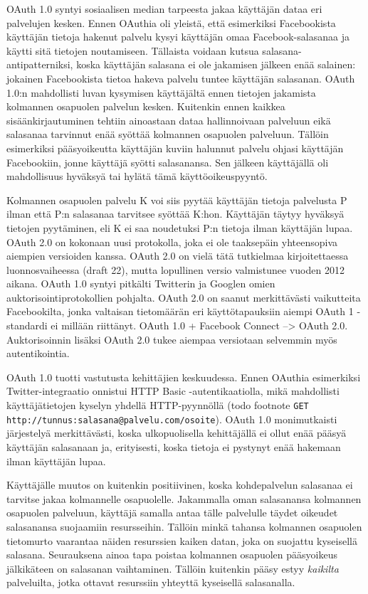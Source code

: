 \documentclass[finnish,gradu]{tktltiki}
\begin{document}
  OAuth 1.0 syntyi sosiaalisen median tarpeesta jakaa käyttäjän dataa eri palvelujen kesken. Ennen OAuthia oli yleistä, että esimerkiksi Facebookista käyttäjän tietoja hakenut palvelu kysyi käyttäjän omaa Facebook-salasanaa ja käytti sitä tietojen noutamiseen. Tällaista voidaan kutsua salasana-antipatterniksi, koska käyttäjän salasana ei ole jakamisen jälkeen enää salainen: jokainen Facebookista tietoa hakeva palvelu tuntee käyttäjän salasanan. OAuth 1.0:n mahdollisti luvan kysymisen käyttäjältä ennen tietojen jakamista kolmannen osapuolen palvelun kesken. Kuitenkin ennen kaikkea sisäänkirjautuminen tehtiin ainoastaan dataa hallinnoivaan palveluun eikä salasanaa tarvinnut enää syöttää kolmannen osapuolen palveluun. Tällöin esimerkiksi pääsyoikeutta käyttäjän kuviin halunnut palvelu ohjasi käyttäjän Facebookiin, jonne käyttäjä syötti salasanansa. Sen jälkeen käyttäjällä oli mahdollisuus hyväksyä tai hylätä tämä käyttöoikeuspyyntö.

  Kolmannen osapuolen palvelu K voi siis pyytää käyttäjän tietoja palvelusta P ilman että P:n salasanaa tarvitsee syöttää K:hon. Käyttäjän täytyy hyväksyä tietojen pyytäminen, eli K ei saa noudetuksi P:n tietoja ilman käyttäjän lupaa.
  OAuth 2.0 on kokonaan uusi protokolla, joka ei ole taaksepäin yhteensopiva aiempien versioiden kanssa. OAuth 2.0 on vielä tätä tutkielmaa kirjoitettaessa luonnosvaiheessa (draft 22), mutta lopullinen versio valmistunee vuoden 2012 aikana. OAuth 1.0 syntyi pitkälti Twitterin ja Googlen omien auktorisointiprotokollien pohjalta. OAuth 2.0 on saanut merkittävästi vaikutteita Facebookilta, jonka valtaisan tietomäärän eri käyttötapauksiin aiempi OAuth 1 -standardi ei millään riittänyt. OAuth 1.0 + Facebook Connect --> OAuth 2.0. Auktorisoinnin lisäksi OAuth 2.0 tukee aiempaa versiotaan selvemmin myös autentikointia.

  OAuth 1.0 tuotti vastutusta kehittäjien keskuudessa. Ennen OAuthia esimerkiksi Twitter-integraatio onnistui HTTP Basic -autentikaatiolla, mikä mahdollisti käyttäjätietojen kyselyn yhdellä HTTP-pyynnöllä (todo footnote \verb#GET http://tunnus:salasana@palvelu.com/osoite#). OAuth 1.0 monimutkaisti järjestelyä merkittävästi, koska ulkopuolisella kehittäjällä ei ollut enää pääsyä käyttäjän salasanaan ja, erityisesti, koska tietoja ei pystynyt enää hakemaan ilman käyttäjän lupaa.

  Käyttäjälle muutos on kuitenkin positiivinen, koska kohdepalvelun salasanaa ei tarvitse jakaa kolmannelle osapuolelle. Jakammalla oman salasanansa kolmannen osapuolen palveluun, käyttäjä samalla antaa tälle palvelulle täydet oikeudet salasanansa suojaamiin resursseihin. Tällöin minkä tahansa kolmannen osapuolen tietomurto vaarantaa näiden resurssien kaiken datan, joka on suojattu kyseisellä salasana. Seurauksena ainoa tapa poistaa kolmannen osapuolen pääsyoikeus jälkikäteen on salasanan vaihtaminen. Tällöin kuitenkin pääsy estyy \emph{kaikilta} palveluilta, jotka ottavat resurssiin yhteyttä kyseisellä salasanalla.
\end{document}
